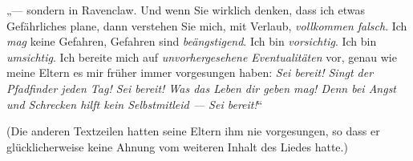 „— sondern in Ravenclaw. Und wenn Sie wirklich denken, dass ich etwas Gefährliches plane, dann verstehen Sie mich, mit Verlaub, \emph{vollkommen falsch}. Ich \emph{mag} keine Gefahren, Gefahren sind \emph{beängstigend}. Ich bin \emph{vorsichtig}. Ich bin \emph{umsichtig}. Ich bereite mich auf \emph{unvorhergesehene Eventualitäten} vor, genau wie meine Eltern es mir früher immer vorgesungen haben: \emph{Sei bereit! Singt der Pfadfinder jeden Tag! Sei bereit! Was das Leben dir geben mag! Denn bei Angst und Schrecken hilft kein Selbstmitleid — Sei bereit!}“%

(Die anderen Textzeilen hatten seine Eltern ihm nie vorgesungen, so dass er glücklicherweise keine Ahnung vom weiteren Inhalt des Liedes hatte.)


